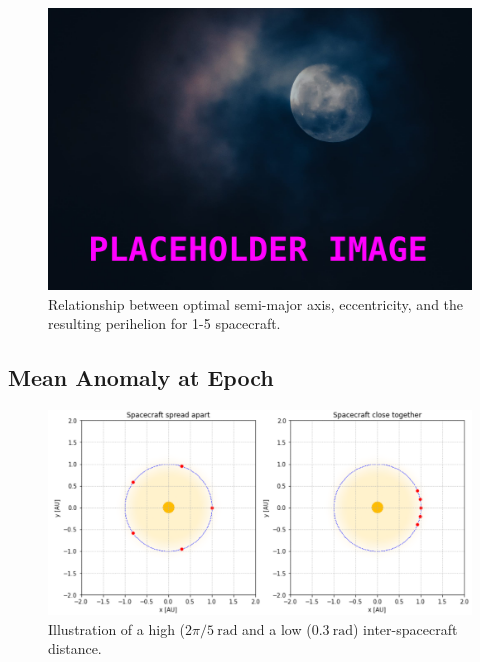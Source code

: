 \begin{figure}[htbp]
 \centering
 \includegraphics[width=1.0\textwidth]{img/eccentricity_optimal.png}
 \caption{Relationship between optimal semi-major axis, eccentricity, and the resulting perihelion for 1-5 spacecraft.}
 \label{fig:eccentricity_optimal}
\end{figure}


\subsection{Mean Anomaly at Epoch}
\begin{figure}
 \centering
 \includegraphics[width=1.0\textwidth]{img/spread_illustration.png}
 \caption{Illustration of a high ($2\pi/5~\mathrm{rad}$ and a low ($0.3~\mathrm{rad}$) inter-spacecraft distance.}
 \label{fig:spread_illustration}
\end{figure}

